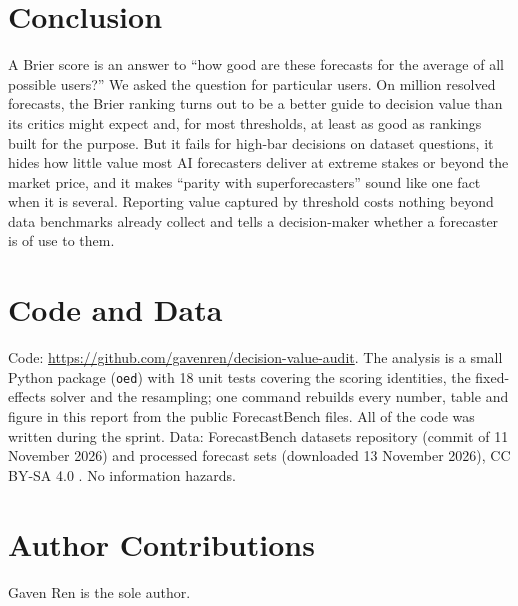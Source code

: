\documentclass[10pt]{article}
\begin{document}
\section{Conclusion}
A Brier score is an answer to ``how good are these forecasts for the average of all possible users?'' We asked the question for particular users. On \nForecastsM{} million resolved forecasts, the Brier ranking turns out to be a better guide to decision value than its critics might expect and, for most thresholds, at least as good as rankings built for the purpose. But it fails for high-bar decisions on dataset questions, it hides how little value most AI forecasters deliver at extreme stakes or beyond the market price, and it makes ``parity with superforecasters'' sound like one fact when it is several. Reporting value captured by threshold costs nothing beyond data benchmarks already collect and tells a decision-maker whether a forecaster is of use to them.

\section*{Code and Data}
Code: \url{https://github.com/gavenren/decision-value-audit}. The analysis is a small Python package (\texttt{oed}) with 18 unit tests covering the scoring identities, the fixed-effects solver and the resampling; one command rebuilds every number, table and figure in this report from the public ForecastBench files. All of the code was written during the sprint. Data: ForecastBench datasets repository (commit of 11 November 2026) and processed forecast sets (downloaded 13 November 2026), CC BY-SA 4.0 \cite{karger2025}. No information hazards.

\section*{Author Contributions}
Gaven Ren is the sole author.
\end{document}

